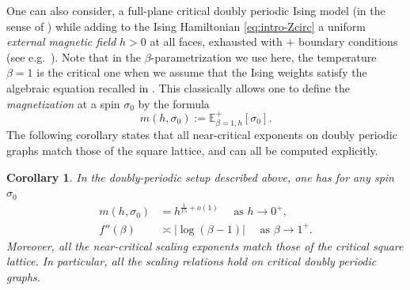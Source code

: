 \documentclass[reqno]{amsart}
\numberwithin{equation}{section}
\newtheorem{corollary}[theo]{Corollary}
\theoremstyle{definition}
\theoremstyle{remark}
\begin{document}
One can also consider, a full-plane critical doubly periodic Ising model (in the sense of \cite{cimasoni-duminil}) while adding to the Ising Hamiltonian \eqref{eq:intro-Zcirc} a uniform \emph{external magnetic field} $h>0$ at all faces, exhausted with $+$ boundary conditions (see e.g.\ \cite{camia2014ising}). Note that in the $\beta$-parametrization we use here, the temperature $\beta=1$ is the critical one when we assume that the Ising weights satisfy the algebraic equation recalled in \cite[Lemma 2.3]{Che20}. This classically allows one to define the \emph{magnetization} at a spin $\sigma_0$ by the formula
\begin{equation*}
m(h,\sigma_0):=\mathbb{E}^{+}_{\beta=1,h}[\sigma_0].
\end{equation*}
The following corollary states that all near-critical exponents on doubly periodic graphs match those of the square lattice, and can all be computed explicitly.
\begin{corollary}\label{cor:exponents}
In the doubly-periodic setup described above, one has for any spin $\sigma_0$
\begin{align}
	m(h,\sigma_0)&=h^{\frac{1}{15}+o(1)} \quad \textrm{ as } h\to 0^+,\\
	f''(\beta)&\asymp |\log(\beta-1)| \quad \textrm{ as } \beta\to 1^+.
\end{align}
Moreover, all the near-critical scaling exponents \cite[Table page 11, $q=2$]{FK_scaling_relations} match those of the critical square lattice. In particular, all the scaling relations  \cite[(R1-R7)]{FK_scaling_relations} hold on critical doubly periodic graphs.
\end{corollary}
\end{document}
